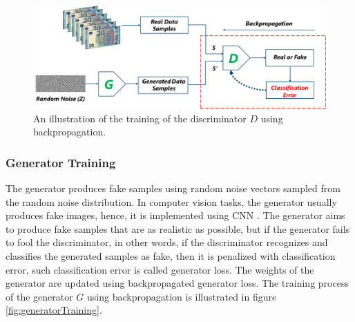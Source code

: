 
\vspace*{0.2cm}
\begin{figure}[H]
        \begin{center}
	    \includegraphics[scale=0.30]{images/Fundamentals/discriminatorTraining.png}
	    \caption[An illustration of the training of the discriminator $D$ using backpropagation.]{An illustration of the training of the discriminator $D$ using backpropagation.}
	    \label{fig:discriminatorTraining}
	    \end{center}
\end{figure}

\subsubsection{Generator Training}\label{TheGeneratorSubSection}

The generator produces fake samples using random noise vectors sampled from the random noise distribution. In computer vision tasks, the generator usually produces fake images, hence, it is implemented using \ac{CNN} \cite{radford2016unsupervised}. The generator aims to produce fake samples that are as realistic as possible, but if the generator fails to fool the discriminator, in other words, if the discriminator recognizes and classifies the generated samples as fake, then it is penalized with classification error, such classification error is called generator loss. The weights of the generator are updated using backpropagated generator loss. The training process of the generator $G$ using backpropagation is illustrated in figure \ref{fig:generatorTraining}.


